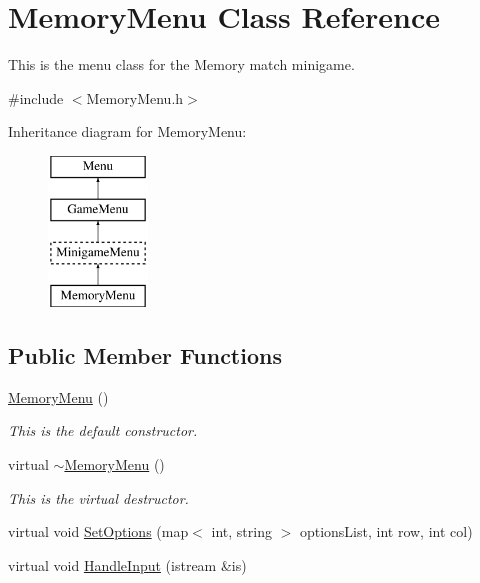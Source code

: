 \hypertarget{classMemoryMenu}{\section{Memory\-Menu Class Reference}
\label{classMemoryMenu}
}


This is the menu class for the Memory match minigame.  




{\ttfamily \#include $<$Memory\-Menu.\-h$>$}

Inheritance diagram for Memory\-Menu\-:\begin{figure}[H]
\begin{center}
\leavevmode
\includegraphics[height=4.000000cm]{classMemoryMenu}
\end{center}
\end{figure}
\subsection*{Public Member Functions}
\begin{DoxyCompactItemize}
\item 
\hyperlink{classMemoryMenu_ae86d93eea6621532fba704fed5c9ec33}{Memory\-Menu} ()
\begin{DoxyCompactList}\small\item\em This is the default constructor. \end{DoxyCompactList}\item 
virtual \hyperlink{classMemoryMenu_a4f364ab881bd477e664ef77ceea105fe}{$\sim$\-Memory\-Menu} ()
\begin{DoxyCompactList}\small\item\em This is the virtual destructor. \end{DoxyCompactList}\item 
virtual void \hyperlink{classMemoryMenu_a71fb82f5208c0f073fc54b6af0917f04}{Set\-Options} (map$<$ int, string $>$ options\-List, int row, int col)
\item 
virtual void \hyperlink{classMemoryMenu_afbe9762ac2e61c6eba82df18aa9aea73}{Handle\-Input} (istream \&is)
\end{DoxyCompactItemize}
